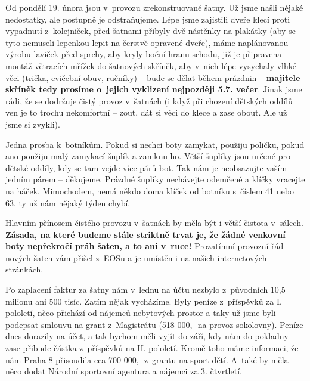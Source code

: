 \documentclass[11pt]{article}
\begin{document}
\clearpage
\nopagecolor
\normalcolor

\restoregeometry
\pagestyle{standard}


Od pondělí 19. února jsou v~provozu zrekonstruované šatny. Už jsme našli nějaké nedostatky, ale postupně je odstraňujeme. Lépe jsme zajistili dveře klecí proti vypadnutí z~kolejniček, před šatnami přibyly dvě nástěnky na plakátky (aby se tyto nemuseli lepenkou lepit na čerstvě opravené dveře), máme naplánovanou výrobu laviček před sprchy, aby kryly boční hranu schodu, již je připravena montáž větracích mřížek do šatnových skříněk, aby v~nich lépe vysychaly vlhké věci (trička, cvičební obuv, ručníky) – bude se dělat během prázdnin – \textbf{majitele skříněk tedy prosíme o~jejich vyklizení nejpozději 5.7. večer}. Jinak jsme rádi, že se dodržuje čistý provoz v~šatnách (i když při chození dětských oddílů ven je to trochu nekomfortní – zout, dát si věci do klece a zase obout. Ale už jsme si zvykli).

Jedna prosba k~botníkům. Pokud si nechci boty zamykat, použiju poličku, pokud ano použiju malý zamykací šuplík a zamknu ho. Větší šuplíky jsou určené pro dětské oddíly, kdy se tam vejde více párů bot. Tak nám je neobsazujte vaším jedním párem – děkujeme. Prázdné šuplíky nechávejte odemčené a klíčky vracejte na háček. Mimochodem, nemá někdo doma klíček od botníku s~číslem 41 nebo 63. ty už nám nějaký týden chybí. 

Hlavním přínosem čistého provozu v~šatnách by měla být i větší čistota v~sálech. \textbf{Zásada, na které budeme stále striktně trvat je, že žádné venkovní boty nepřekročí práh šaten, a to ani v~ruce!} Prozatímní provozní řád nových šaten vám přišel z~EOSu a je umístěn i na našich internetových stránkách.

Po zaplacení faktur za šatny nám v~lednu na účtu nezbylo z~původních 10,5 milionu ani 500 tisíc. Zatím nějak vycházíme. Byly peníze z~příspěvků za I. pololetí, něco přichází od nájemců nebytových prostor a taky už jsme byli podepsat smlouvu na grant z~Magistrátu (518 000,- na provoz sokolovny). Peníze dnes dorazily na účet, a tak bychom měli vyjít do září, kdy nám do pokladny zase přibude částka z~příspěvků na II. pololetí. Kromě toho máme informaci, že nám Praha 8 přisoudila cca 700 000,- z~grantu na sport dětí. A~také by měla něco dodat Národní sportovní agentura a nájemci za 3. čtvrtletí.
\end{document}
